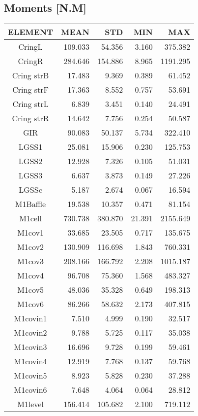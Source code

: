 \subsection{Moments [N.M]}
\begin{longtable}{crrrr}\toprule
 ELEMENT & MEAN & STD & MIN & MAX \\\hline
 CringL & 109.033 & 54.356 & 3.160 & 375.382 \\
 CringR & 284.646 & 154.886 & 8.965 & 1191.295 \\
 Cring strB & 17.483 & 9.369 & 0.389 & 61.452 \\
 Cring strF & 17.363 & 8.552 & 0.757 & 53.691 \\
 Cring strL & 6.839 & 3.451 & 0.140 & 24.491 \\
 Cring strR & 14.642 & 7.756 & 0.254 & 50.587 \\
 GIR & 90.083 & 50.137 & 5.734 & 322.410 \\
 LGSS1 & 25.081 & 15.906 & 0.230 & 125.753 \\
 LGSS2 & 12.928 & 7.326 & 0.105 & 51.031 \\
 LGSS3 & 6.637 & 3.873 & 0.149 & 27.226 \\
 LGSSc & 5.187 & 2.674 & 0.067 & 16.594 \\
 M1Baffle & 19.538 & 10.357 & 0.471 & 81.154 \\
 M1cell & 730.738 & 380.870 & 21.391 & 2155.649 \\
 M1cov1 & 33.685 & 23.505 & 0.717 & 135.675 \\
 M1cov2 & 130.909 & 116.698 & 1.843 & 760.331 \\
 M1cov3 & 208.166 & 166.792 & 2.208 & 1015.187 \\
 M1cov4 & 96.708 & 75.360 & 1.568 & 483.327 \\
 M1cov5 & 48.036 & 35.328 & 0.649 & 198.313 \\
 M1cov6 & 86.266 & 58.632 & 2.173 & 407.815 \\
 M1covin1 & 7.510 & 4.999 & 0.190 & 32.517 \\
 M1covin2 & 9.788 & 5.725 & 0.117 & 35.038 \\
 M1covin3 & 16.696 & 9.728 & 0.199 & 59.461 \\
 M1covin4 & 12.919 & 7.768 & 0.137 & 59.768 \\
 M1covin5 & 8.923 & 5.828 & 0.230 & 37.288 \\
 M1covin6 & 7.648 & 4.064 & 0.064 & 28.812 \\
 M1level & 156.414 & 105.682 & 2.100 & 719.112 \\

\end{longtable}
